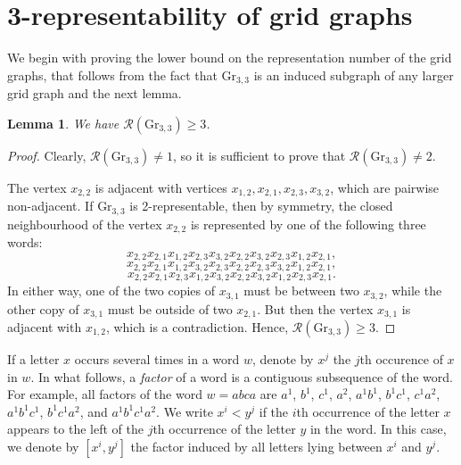 \documentclass[11pt]{article}
\newtheorem{lemma}[theorem]{Lemma}
\begin{document}
\section{3-representability of grid graphs}\label{Gr-sec}

We begin with proving the lower bound on the representation number of the grid graphs, that follows from the fact that  $\mbox{Gr}_{3,3}$ is an induced subgraph of any larger grid graph and the next lemma.

\begin{lemma}\label{lem-Gr33} We have $\mathcal{R}(\mbox{Gr}_{3,3})\geq 3$. \end{lemma} 

\begin{proof} Clearly, $\mathcal{R}(\mbox{Gr}_{3,3})\neq 1$, so it is sufficient to prove that $\mathcal{R}(\mbox{Gr}_{3,3})\neq 2$. 

The vertex $x_{2,2}$ is adjacent with vertices $x_{1,2},x_{2,1},x_{2,3}, x_{3,2}$, which are pairwise non-adjacent. If $\mbox{Gr}_{3,3}$ is 2-representable, then by symmetry, the closed neighbourhood of the vertex $x_{2,2}$  is represented by one of the following three words:
$$x_{2,2}x_{2,1}x_{1,2}x_{2,3}x_{3,2}x_{2,2}x_{3,2}x_{2,3}x_{1,2}x_{2,1},$$
$$x_{2,2}x_{2,1}x_{1,2}x_{3,2}x_{2,3}x_{2,2}x_{2,3}x_{3,2}x_{1,2}x_{2,1},$$
$$ x_{2,2}x_{2,1}x_{2,3}x_{1,2}x_{3,2}x_{2,2}x_{3,2}x_{1,2}x_{2,3}x_{2,1}.$$
In either way, one of the two copies of $x_{3,1}$ must be between two $x_{3,2}$, while the other copy of  $x_{3,1}$  must be outside of two  $x_{2,1}$. But then the vertex  $x_{3,1}$  is adjacent with  $x_{1,2}$, %
which is a contradiction. Hence,  $\mathcal{R}(\mbox{Gr}_{3,3})\geq 3$.
\end{proof}



If a letter $x$ occurs several times in a word $w$, denote by $x^j$ the $j$th occurence of $x$ in $w$.  In what follows, a {\it factor} of a word is a contiguous subsequence of the word. For example, all factors of the word $w=abca$ are $a^1$, $b^1$, $c^1$, $a^2$, $a^1b^1$, $b^1c^1$, $c^1a^2$, $a^1b^1c^1$, $b^1c^1a^2$, and $a^1b^1c^1a^2$.
We write \( x^i < y^j \) if the \( i \)th occurrence of the letter \( x \) appears to the left of the \( j \)th occurrence of the letter \( y \) in the word. In this case, we denote by \( [x^i, y^j] \) the factor induced by all letters lying between \( x^i \) and \( y^j \).
\end{document}
